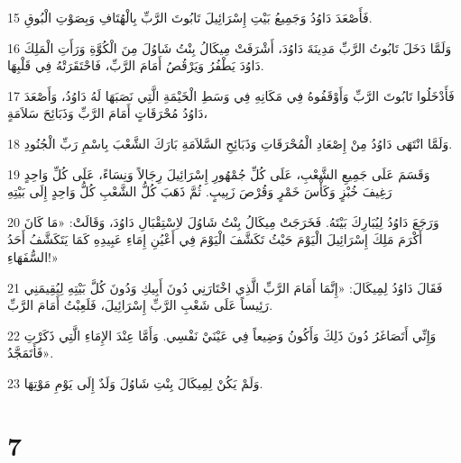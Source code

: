 \par 15 فَأَصْعَدَ دَاوُدُ وَجَمِيعُ بَيْتِ إِسْرَائِيلَ تَابُوتَ الرَّبِّ بِالْهُتَافِ وَبِصَوْتِ الْبُوقِ.
\par 16 وَلَمَّا دَخَلَ تَابُوتُ الرَّبِّ مَدِينَةَ دَاوُدَ، أَشْرَفَتْ مِيكَالُ بِنْتُ شَاوُلَ مِنَ الْكُوَّةِ وَرَأَتِ الْمَلِكَ دَاوُدَ يَطْفُرُ وَيَرْقُصُ أَمَامَ الرَّبِّ، فَاحْتَقَرَتْهُ فِي قَلْبِهَا.
\par 17 فَأَدْخَلُوا تَابُوتَ الرَّبِّ وَأَوْقَفُوهُ فِي مَكَانِهِ فِي وَسَطِ الْخَيْمَةِ الَّتِي نَصَبَهَا لَهُ دَاوُدُ، وَأَصْعَدَ دَاوُدُ مُحْرَقَاتٍ أَمَامَ الرَّبِّ وَذَبَائِحَ سَلاَمَةٍ،
\par 18 وَلَمَّا انْتَهَى دَاوُدُ مِنْ إِصْعَادِ الْمُحْرَقَاتِ وَذَبَائِحِ السَّلاَمَةِ بَارَكَ الشَّعْبَ بِاسْمِ رَبِّ الْجُنُودِ.
\par 19 وَقَسَمَ عَلَى جَمِيعِ الشَّعْبِ، عَلَى كُلِّ جُمْهُورِ إِسْرَائِيلَ رِجَالاً وَنِسَاءً، عَلَى كُلِّ وَاحِدٍ رَغِيفَ خُبْزٍ وَكَأْسَ خَمْرٍ وَقُرْصَ زَبِيبٍ. ثُمَّ ذَهَبَ كُلُّ الشَّعْبِ كُلُّ وَاحِدٍ إِلَى بَيْتِهِ
\par 20 وَرَجَعَ دَاوُدُ لِيُبَارِكَ بَيْتَهُ. فَخَرَجَتْ مِيكَالُ بِنْتُ شَاوُلَ لاِسْتِقْبَالِ دَاوُدَ، وَقَالَتْ: «مَا كَانَ أَكْرَمَ مَلِكَ إِسْرَائِيلَ الْيَوْمَ حَيْثُ تَكَشَّفَ الْيَوْمَ فِي أَعْيُنِ إِمَاءِ عَبِيدِهِ كَمَا يَتَكَشَّفُ أَحَدُ السُّفَهَاءِ!»
\par 21 فَقَالَ دَاوُدُ لِمِيكَالَ: «إِنَّمَا أَمَامَ الرَّبِّ الَّذِي اخْتَارَنِي دُونَ أَبِيكِ وَدُونَ كُلَّ بَيْتِهِ لِيُقِيمَنِي رَئِيساً عَلَى شَعْبِ الرَّبِّ إِسْرَائِيلَ، فَلَعِبْتُ أَمَامَ الرَّبِّ.
\par 22 وَإِنِّي أَتَصَاغَرُ دُونَ ذَلِكَ وَأَكُونُ وَضِيعاً فِي عَيْنَيْ نَفْسِي. وَأَمَّا عِنْدَ الإِمَاءِ الَّتِي ذَكَرْتِ فَأَتَمَجَّدُ».
\par 23 وَلَمْ يَكُنْ لِمِيكَالَ بِنْتِ شَاوُلَ وَلَدٌ إِلَى يَوْمِ مَوْتِهَا.

\chapter{7}

